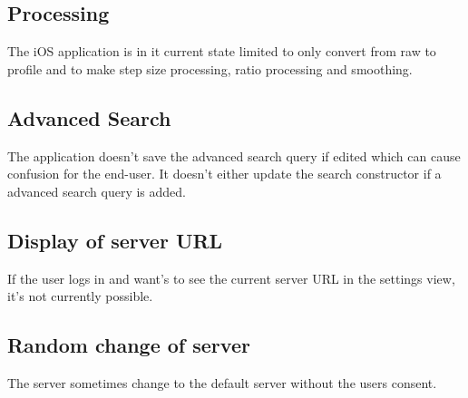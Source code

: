 


\subsection{Processing}
The iOS application is in it current state limited to only convert from raw to profile and to make step size processing, ratio processing and smoothing. 

\subsection{Advanced Search}
The application doesn't save the advanced search query if edited which can cause confusion for the end-user. It doesn't either update the search constructor if a advanced search query is added.  

\subsection{Display of server URL}
If the user logs in and want's to see the current server URL in the settings view, it's not currently possible.

\subsection{Random change of server}
The server sometimes change to the default server without the users consent. 
